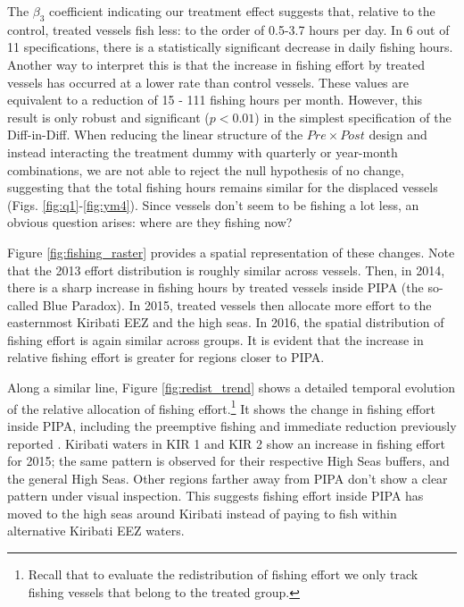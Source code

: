 \documentclass[11pt,english]{article}
\begin{document}
The \(\beta_3\) coefficient indicating our treatment effect suggests
that, relative to the control, treated vessels fish less: to the order
of 0.5-3.7 hours per day. In 6 out of 11 specifications, there is a statistically significant decrease in daily fishing hours. Another way to interpret this is that the increase
in fishing effort by treated vessels has occurred at a lower rate than
control vessels. These values are equivalent to a reduction of 15 - 111 fishing hours per month. However, this result is only robust and
significant (\(p < 0.01\)) in the simplest specification of the
Diff-in-Diff. When reducing the linear structure of the
\(Pre \times Post\) design and instead interacting the treatment dummy
with quarterly or year-month combinations, we are not able to reject the
null hypothesis of no change, suggesting that the total fishing hours
remains similar for the displaced vessels (Figs.
\ref{fig:q1}-\ref{fig:ym4}). Since vessels don't seem to be fishing a lot less, an obvious question arises: where are they
fishing now?

Figure \ref{fig:fishing_raster} provides a spatial representation of
these changes. Note that the 2013 effort distribution is roughly similar
across vessels. Then, in 2014, there is a sharp increase in fishing hours
by treated vessels inside PIPA (the so-called Blue Paradox). In 2015, treated vessels
then allocate more effort to the easternmost Kiribati EEZ and the high seas. In 2016, the spatial distribution of
fishing effort is again similar across groups. It is evident that the
increase in relative fishing effort is greater for regions closer to
PIPA.

Along a similar line, Figure \ref{fig:redist_trend} shows a detailed
temporal evolution of the relative allocation of fishing
effort.\footnote{Recall that to evaluate the redistribution of fishing effort we only track fishing vessels that belong to the treated group.}
It shows the change in fishing effort inside PIPA, including the
preemptive fishing and immediate reduction previously reported
\citep{mcdermott_2018}. Kiribati waters in KIR 1 and KIR 2 show an
increase in fishing effort for 2015; the same pattern is observed for
their respective High Seas buffers, and the general High Seas. Other
regions farther away from PIPA don't show a clear pattern under visual
inspection. This suggests fishing effort inside PIPA has moved to the high seas around Kiribati instead of paying to fish within alternative Kiribati EEZ waters.
\end{document}
